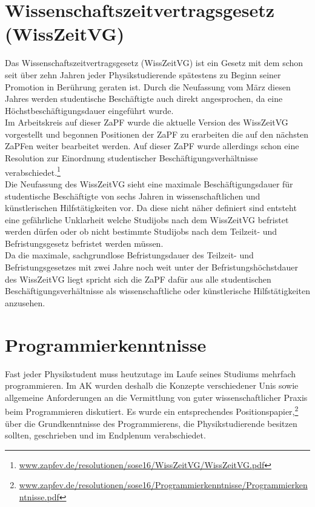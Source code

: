 \section*{Wissenschaftszeitvertragsgesetz (WissZeitVG)}
Das Wissenschaftszeitvertragsgesetz (WissZeitVG) ist ein Gesetz mit dem schon 
seit über zehn Jahren jeder Physikstudierende spätestens zu Beginn seiner 
Promotion in Berührung geraten ist. Durch die Neufassung vom März diesen 
Jahres werden studentische Beschäftigte auch direkt angesprochen, da eine 
Höchstbeschäftigungsdauer eingeführt wurde.\\
Im Arbeitskreis auf dieser ZaPF wurde die aktuelle Version des WissZeitVG 
vorgestellt und begonnen Positionen der ZaPF zu erarbeiten die auf den nächsten 
ZaPFen weiter bearbeitet werden. Auf dieser ZaPF wurde allerdings schon eine 
Resolution zur Einordnung studentischer Beschäftigungsverhältnisse 
verabschiedet.\footnote{\href{http://www.zapfev.de/resolutionen/sose16/WissZeitVG/WissZeitVG.pdf}{\url{www.zapfev.de/resolutionen/sose16/WissZeitVG/WissZeitVG.pdf}}}\\
Die Neufassung des WissZeitVG sieht eine maximale Beschäftigungsdauer für 
studentische Beschäftigte von sechs Jahren in wissenschaftlichen und 
künstlerischen Hilfstätigkeiten vor. Da diese nicht näher definiert sind 
entsteht eine gefährliche Unklarheit welche Studijobs nach dem WissZeitVG 
befristet werden dürfen oder ob nicht bestimmte Studijobs nach dem Teilzeit- 
und Befristungsgesetz befristet werden müssen.\\
Da die maximale, sachgrundlose Befristungsdauer des Teilzeit- und 
Befristungsgesetzes mit zwei Jahre noch weit unter der Befristungshöchstdauer 
des WissZeitVG liegt spricht sich die ZaPF dafür aus alle studentischen 
Beschäftigungsverhältnisse als wissenschaftliche oder künstlerische 
Hilfstätigkeiten anzusehen. \\

\section*{Programmierkenntnisse}
Fast jeder Physikstudent muss heutzutage im Laufe seines Studiums mehrfach 
programmieren. Im AK wurden deshalb die Konzepte verschiedener Unis sowie 
allgemeine Anforderungen an die Vermittlung von guter wissenschaftlicher Praxis 
beim Programmieren diskutiert. Es wurde ein entsprechendes 
Positionspapier,\footnote{\href{http://www.zapfev.de/resolutionen/sose16/Programmierkenntnisse/Programmierkenntnisse.pdf}{\url{www.zapfev.de/resolutionen/sose16/Programmierkenntnisse/Programmierkenntnisse.pdf}}}
 über die Grundkenntnisse des Programmierens, die Physikstudierende besitzen 
 sollten, geschrieben und im Endplenum verabschiedet.

